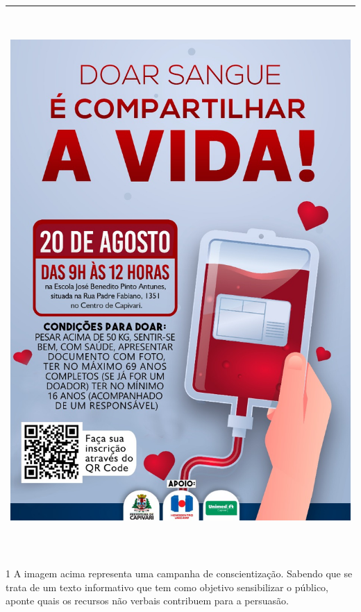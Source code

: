 {\begin{longtable}[]{@{}l@{}}
\toprule
\endhead
\includegraphics[width=5.76042in,height=8.15278in]{./imgSAEB_7_POR/media/image1.png} \\
\bottomrule
\end{longtable}


\num{1} A imagem acima representa uma campanha de conscientização. Sabendo que se trata de um texto informativo que tem como objetivo sensibilizar o público, aponte quais os recursos não verbais contribuem para a persuasão.

}
